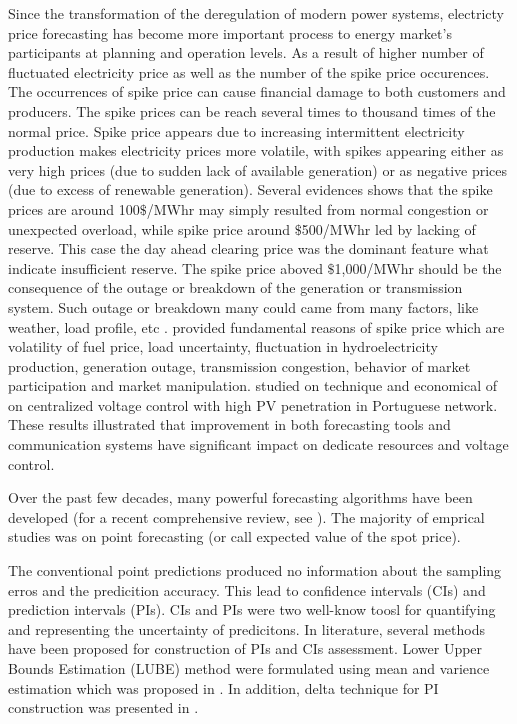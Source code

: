 \documentclass[review]{elsarticle}
\begin{document}
    Since the transformation of the deregulation of modern power systems, electricty price forecasting has become more important process to energy market's participants at planning and operation levels.
    As a result of higher number of fluctuated electricity price as well as the number of the spike price occurences.
    The occurrences of spike price can cause financial damage to both customers and producers.
    The spike prices can be reach several times to thousand times of the normal price.
    Spike price appears due to increasing intermittent electricity production makes electricity prices more volatile, with spikes appearing either as very high prices (due to sudden lack of available generation) or as negative prices (due to excess of renewable generation).
    Several evidences shows that the spike prices are around 100$\$$/MWhr may simply resulted from normal congestion or unexpected overload, while spike price around $\$$500/MWhr led by lacking of reserve.
    This case the day ahead clearing price was the dominant feature what indicate insufficient reserve. The spike price aboved $\$$1,000/MWhr should be the consequence of the outage or breakdown of the generation or transmission system.
    Such outage or breakdown many could came from many factors, like weather, load profile, etc  \cite{He2016}.
    \cite{SINGHAL2011550} provided fundamental reasons of spike price which are volatility of fuel price, load uncertainty, fluctuation in hydroelectricity production, generation outage, transmission congestion, behavior of market participation and market manipulation.
    \cite{GONZALEZSOTRES2017338} studied on technique and economical of on centralized voltage control with high PV penetration in Portuguese network.
    These results illustrated that improvement in both forecasting tools and communication systems have significant impact on dedicate resources and voltage control.

    Over the past few decades, many powerful forecasting algorithms have been developed (for a recent comprehensive review, see \cite{Weron2014}).
    The majority of emprical studies was on point forecasting (or call expected value of the spot price).

    The conventional point predictions produced no information about the sampling erros and the predicition accuracy.
    This lead to confidence intervals (CIs) and prediction intervals (PIs).
    CIs and PIs were two well-know toosl for quantifying and representing the uncertainty of predicitons.
    In literature, several methods have been proposed for construction of PIs and CIs assessment.
    Lower Upper Bounds Estimation (LUBE) method were formulated using mean and varience estimation which was proposed in \cite{Khosravi2011}.
    In addition, delta technique for PI construction was presented in \cite{KhosraviA2010}.
\end{document}
